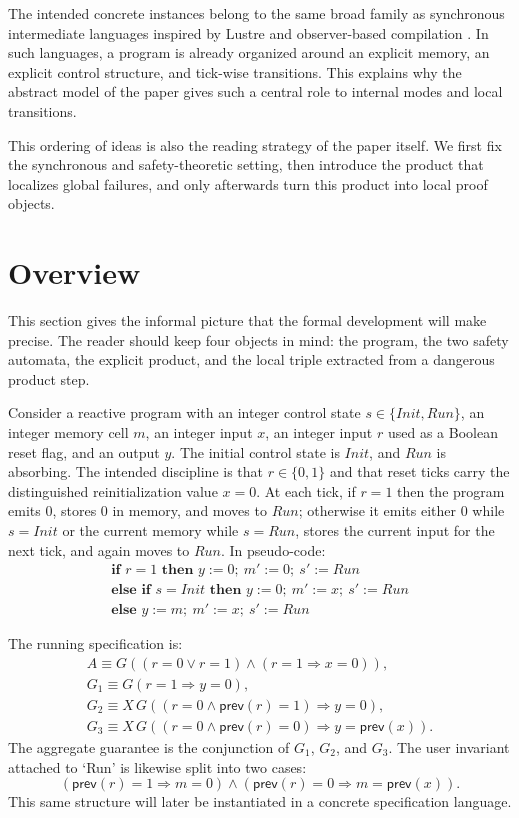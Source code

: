 \documentclass[acmsmall,screen]{acmart}
\theoremstyle{leftplain}
\theoremstyle{leftdefinition}
\theoremstyle{leftremark}
\begin{document}
The intended concrete instances belong to the same broad family as synchronous
intermediate languages inspired by Lustre and observer-based compilation
\cite{halbwachs-1991,lustre-v6-manual,safecomp-observers}. In such languages, a program is
already organized around an explicit memory, an explicit control structure, and
tick-wise transitions. This explains why the abstract model of the paper gives
such a central role to internal modes and local transitions.

This ordering of ideas is also the reading strategy of the paper itself. We
first fix the synchronous and safety-theoretic setting, then introduce the
product that localizes global failures, and only afterwards turn this product
into local proof objects.

\section{Overview}\label{sec:overview}
This section gives the informal picture that the formal development will make
precise. The reader should keep four objects in mind: the program, the two
safety automata, the explicit product, and the local triple extracted from a
dangerous product step.

Consider a reactive program with an integer control state
$s \in \{\mathit{Init},\mathit{Run}\}$, an integer memory cell $m$, an integer
input $x$, an integer input $r$ used as a Boolean reset flag, and an output
$y$. The initial control state is $\mathit{Init}$, and $\mathit{Run}$ is
absorbing. The intended discipline is that $r \in \{0,1\}$ and that reset
ticks carry the distinguished reinitialization value $x = 0$. At each tick, if
$r = 1$ then the program emits $0$, stores $0$ in memory, and moves to
$\mathit{Run}$; otherwise it emits either $0$ while $s=\mathit{Init}$ or the
current memory while $s=\mathit{Run}$, stores the current input for the next
tick, and again moves to $\mathit{Run}$. In pseudo-code:
\[
\begin{array}{l}
\textbf{if } r = 1 \textbf{ then } y := 0;\ m' := 0;\ s' := \mathit{Run} \\
\textbf{else if } s = \mathit{Init} \textbf{ then } y := 0;\ m' := x;\ s' := \mathit{Run} \\
\textbf{else } y := m;\ m' := x;\ s' := \mathit{Run}
\end{array}
\]

The running specification is:
\[
\begin{array}{l}
A \equiv G((r = 0 \lor r = 1) \land (r = 1 \Rightarrow x = 0)), \\
G_1 \equiv G(r = 1 \Rightarrow y = 0), \\
G_2 \equiv X\,G((r = 0 \land \mathsf{prev}(r) = 1) \Rightarrow y = 0), \\
G_3 \equiv X\,G((r = 0 \land \mathsf{prev}(r) = 0) \Rightarrow y = \mathsf{prev}(x)).
\end{array}
\]
The aggregate guarantee is the conjunction of $G_1$, $G_2$, and $G_3$. The
user invariant attached to `Run' is likewise split into two cases:
\[
(\mathsf{prev}(r) = 1 \Rightarrow m = 0)
\land
(\mathsf{prev}(r) = 0 \Rightarrow m = \mathsf{prev}(x)).
\]
This same structure will later be instantiated in a concrete specification
language.
\end{document}

